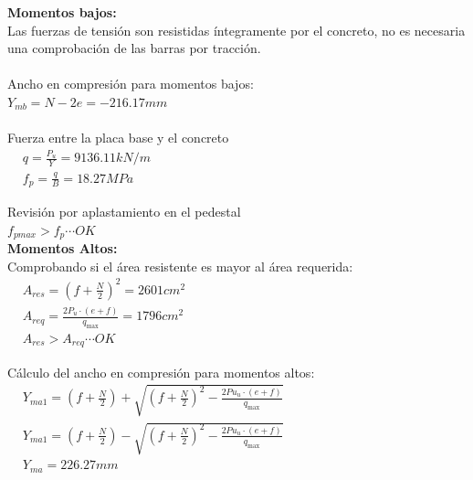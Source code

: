 \documentclass[12pt]{article}
\begin{document}
    \noindent \textbf{Momentos bajos:} \\
    Las fuerzas de tensión son resistidas íntegramente por el concreto, no es necesaria una comprobación de las barras por tracción.\\ \\
    Ancho en compresión para momentos bajos:\\
    $Y_{mb} = N-2e=-216.17 mm$ \\ \\
    Fuerza entre la placa base y el concreto
    \begin{align*}
        &q = \frac{P_u}{Y} = 9136.11 kN/m \hspace{15cm}\\
        &f_p = \frac{q}{B} = 18.27 MPa
    \end{align*}


    \noindent Revisión por aplastamiento en el pedestal \\
    $f_{pmax} > f_{p} \cdots OK$ \\

    \noindent \textbf{Momentos Altos:} \\
    Comprobando si el área resistente es mayor al área requerida:
    \begin{align*}
        &A_{res} = {\left( f+\frac{N}{2} \right) }^2=2601 cm^2 \hspace{15cm}\\
        &A_{req} =\frac{2P_u \cdot (e+f) }{q_{\max}} = 1796 cm^2 \\
        &A_{res} > A_{req} \cdots OK
    \end{align*}

    \noindent Cálculo del ancho en compresión para momentos altos:
        \begin{align*}
            &Y_{ma1} = \left( f+\frac{N}{2} \right) + \sqrt{{\left( f+\frac{N}{2} \right)}^2 -\frac{2 Pu_u \cdot (e+f) }{q_{\max}}} \hspace{15cm} \\
            &Y_{ma1} = \left( f+\frac{N}{2} \right) - \sqrt{{\left( f+\frac{N}{2} \right)}^2 -\frac{2 Pu_u \cdot (e+f) }{q_{\max}}} \\
            &Y_{ma} = 226.27 mm 
        \end{align*}
    
\end{document}
